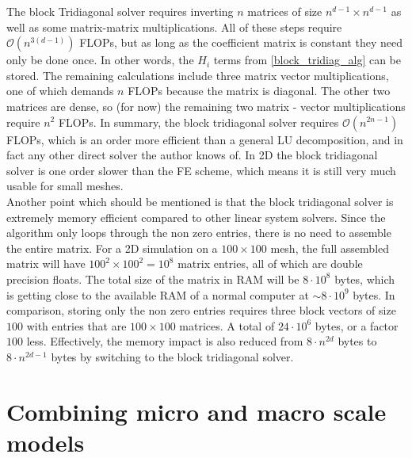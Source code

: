 The block Tridiagonal solver requires inverting $n$ matrices of size $n^{d-1}\times n^{d-1}$ as well as some matrix-matrix multiplications. 
All of these steps require $\mathcal O(n^{3(d-1)})$ FLOPs, but as long as the coefficient matrix is constant they need only be done once. 
In other words, the $H_i$ terms from \eqref{block_tridiag_alg} can be stored. 
The remaining calculations include three matrix vector multiplications, one of which demands $n$ FLOPs because the matrix is diagonal. 
The other two matrices are dense, so (for now) the remaining two matrix - vector multiplications require $n^2$ FLOPs. 
In summary, the block tridiagonal solver requires $\mathcal{O}(n^{2n-1})$ FLOPs, which is an order more efficient than a general LU decomposition, and in fact any other direct solver the author knows of. 
In 2D the block tridiagonal solver is one order slower than the FE scheme, which means it is still very much usable for small meshes. \\

Another point which should be mentioned is that the block tridiagonal solver is extremely memory efficient compared to other linear system solvers. 
Since the algorithm only loops through the non zero entries, there is no need to assemble the entire matrix. 
For a 2D simulation on a $100\times 100$ mesh, the full assembled matrix will have $100^2\times100^2 = 10^8$ matrix entries, all of which are double precision floats. 
The total size of the matrix in RAM will be $8\cdot10^8$ bytes, which is getting close to the available RAM of a normal computer at  $\sim 8\cdot10^9$ bytes. 
In comparison, storing only the non zero entries requires three block vectors of size $100$ with entries that are $100\times100$ matrices. A total of $24\cdot10^6$ bytes, or a factor $100$ less. 
Effectively, the memory impact is also reduced from $8\cdot n^{2d}$ bytes to $8\cdot n^{2d-1}$ bytes by switching to the block tridiagonal solver. 


\section{Combining micro and macro scale models}

